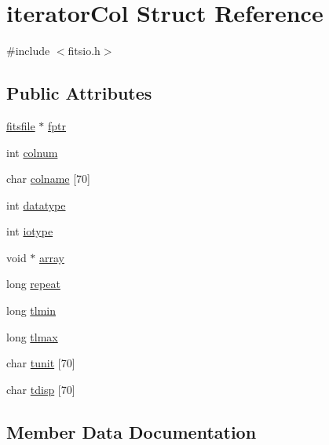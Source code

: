 \hypertarget{structiterator_col}{}\section{iterator\+Col Struct Reference}
\label{structiterator_col}


{\ttfamily \#include $<$fitsio.\+h$>$}

\subsection*{Public Attributes}
\begin{DoxyCompactItemize}
\item 
\hyperlink{structfitsfile}{fitsfile} $\ast$ \hyperlink{structiterator_col_a99ebb0945571fe0b3d67091ee7818f08}{fptr}
\item 
int \hyperlink{structiterator_col_a7de04e6be3f015f3f6ec2f99e32ddd4c}{colnum}
\item 
char \hyperlink{structiterator_col_a739785341d3e14d9d62d8773723d204b}{colname} \mbox{[}70\mbox{]}
\item 
int \hyperlink{structiterator_col_ad6b270828036002e0a907f254fee41bd}{datatype}
\item 
int \hyperlink{structiterator_col_aaebe8c4abea7ff923139aaea9534b20b}{iotype}
\item 
void $\ast$ \hyperlink{structiterator_col_a158b5f9123106f24eaca2957e5af26f4}{array}
\item 
long \hyperlink{structiterator_col_a4316f8b44d3df0ca6c847ee578ef2f2a}{repeat}
\item 
long \hyperlink{structiterator_col_acdacdd8ce6d68735ce3bb58edd8f8925}{tlmin}
\item 
long \hyperlink{structiterator_col_a46b1c744ebe68dd1625146ab2dec68b4}{tlmax}
\item 
char \hyperlink{structiterator_col_a95d24fc7cc1970f5b2d1eacb33656a1e}{tunit} \mbox{[}70\mbox{]}
\item 
char \hyperlink{structiterator_col_aec9b557e996039d996d4621f23200883}{tdisp} \mbox{[}70\mbox{]}
\end{DoxyCompactItemize}


\subsection{Member Data Documentation}
\mbox{\label{structiterator_col_a158b5f9123106f24eaca2957e5af26f4}} 
